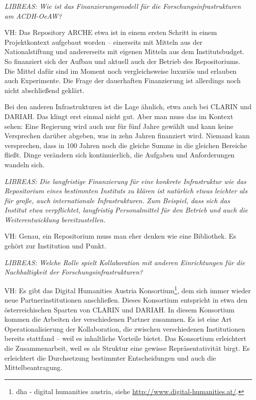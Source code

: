 \documentclass[a4paper,
fontsize=11pt,
oneside,
numbers=noperiodatend,
parskip=half-,
bibliography=totoc,
final
]{scrartcl}
\begin{document}
\emph{LIBREAS: Wie ist das Finanzierungsmodell für die
Forschungsinfrastrukturen am ACDH-OeAW?}

VH: Das Repository ARCHE etwa ist in einem ersten Schritt in einem
Projektkontext aufgebaut worden -- einerseits mit Mitteln aus der
Nationalstiftung und andererseits mit eigenen Mitteln aus dem
Institutsbudget. So finanziert sich der Aufbau und aktuell auch der
Betrieb des Repositoriums. Die Mittel dafür sind im Moment noch
vergleichsweise luxuriös und erlauben auch Experimente. Die Frage der
dauerhaften Finanzierung ist allerdings noch nicht abschließend geklärt.

Bei den anderen Infrastrukturen ist die Lage ähnlich, etwa auch bei
CLARIN und DARIAH. Das klingt erst einmal nicht gut. Aber man muss das
im Kontext sehen: Eine Regierung wird auch nur für fünf Jahre gewählt
und kann keine Versprechen darüber abgeben, was in zehn Jahren
finanziert wird. Niemand kann versprechen, dass in 100 Jahren noch die
gleiche Summe in die gleichen Bereiche fließt. Dinge verändern sich
kontinuierlich, die Aufgaben und Anforderungen wandeln sich.

\emph{LIBREAS: Die langfristige Finanzierung für eine konkrete
Infrastruktur wie das Repositorium eines bestimmten Instituts zu klären
ist natürlich etwas leichter als für große, auch internationale
Infrastrukturen. Zum Beispiel, dass sich das Institut etwa verpflichtet,
langfristig Personalmittel für den Betrieb und auch die
Weiterentwicklung bereitzustellen.}

VH: Genau, ein Repositorium muss man eher denken wie eine Bibliothek. Es
gehört zur Institution und Punkt.

\emph{LIBREAS: Welche Rolle spielt Kollaboration mit anderen
Einrichtungen für die Nachhaltigkeit der Forschungsinfrastrukturen?}

VH: Es gibt das Digital Humanities Austria Konsortium\footnote{dha -
  digital humanities austria, siehe
  \url{http://www.digital-humanities.at/}.}, dem sich immer wieder neue
Partnerinstitutionen anschließen. Dieses Konsortium entspricht in etwa
den österreichischen Sparten von CLARIN und DARIAH. In diesem Konsortium
kommen die Arbeiten der verschiedenen Partner zusammen. Es ist eine Art
Operationalisierung der Kollaboration, die zwischen verschiedenen
Institutionen bereits stattfand -- weil es inhaltliche Vorteile bietet.
Das Konsortium erleichtert die Zusammenarbeit, weil es als Struktur eine
gewisse Repräsentativität birgt. Es erleichtert die Durchsetzung
bestimmter Entscheidungen und auch die Mittelbeantragung.
\end{document}
